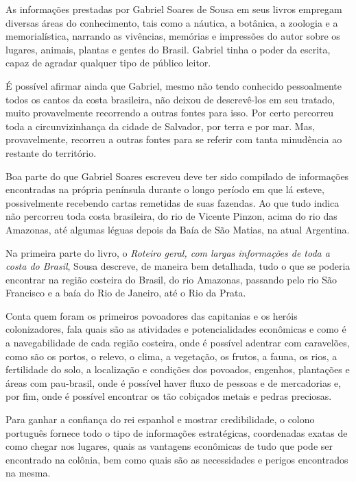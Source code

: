 \documentclass[12pt]{extarticle}
\begin{document}
As informações prestadas por Gabriel Soares de Sousa em seus livros empregam diversas áreas do conhecimento, tais como a náutica, a botânica, a zoologia e a memorialística, narrando as vivências, memórias e impressões do autor sobre os lugares, animais, plantas e gentes do Brasil. Gabriel tinha o poder da escrita, capaz de agradar qualquer tipo de público leitor.

É possível afirmar ainda que Gabriel, mesmo não tendo conhecido pessoalmente todos os cantos da costa brasileira, não deixou de descrevê-los em seu tratado, muito provavelmente recorrendo a outras fontes para isso. Por certo percorreu toda a circunvizinhança da cidade de Salvador, por terra e por mar. Mas, provavelmente, recorreu a outras fontes para se referir com tanta minudência ao restante do território.

Boa parte do que Gabriel Soares escreveu deve ter sido compilado de informações encontradas na própria península durante o longo período em que lá esteve, possivelmente recebendo cartas remetidas de suas fazendas. Ao que tudo indica não percorreu toda costa brasileira, do rio de Vicente Pinzon, acima do rio das Amazonas, até algumas léguas depois da Baía de São Matias, na atual Argentina. 

Na primeira parte do livro, o \emph{Roteiro geral, com largas informações de toda a costa do Brasil}, Sousa descreve, de maneira bem detalhada, tudo o que se poderia encontrar na região costeira do Brasil, do rio Amazonas, passando pelo rio São Francisco e a baía do Rio de Janeiro, até o Rio da Prata.

Conta quem foram os primeiros povoadores das capitanias e os heróis colonizadores, fala quais são as atividades e potencialidades econômicas e como é a navegabilidade de cada região costeira, onde é possível adentrar com caravelões, como são os portos, o relevo, o clima, a vegetação, os frutos, a fauna, os rios, a fertilidade do solo, a localização e condições dos povoados, engenhos, plantações e áreas com pau-brasil, onde é possível haver fluxo de pessoas e de mercadorias e, por fim, onde é possível encontrar os tão cobiçados metais e pedras preciosas.

Para ganhar a confiança do rei espanhol e mostrar credibilidade, o colono português fornece todo o tipo de informações estratégicas, coordenadas exatas de como chegar nos lugares, quais as vantagens econômicas de tudo que pode ser encontrado na colônia, bem como quais são as necessidades e perigos encontrados na mesma.
\end{document}
